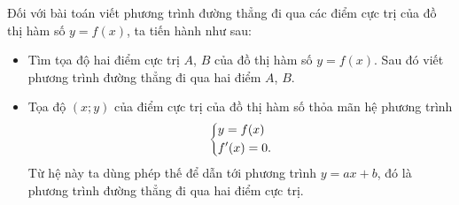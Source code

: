 \begin{note}
	Đối với bài toán viết phương trình đường thẳng đi qua các điểm cực trị của đồ thị hàm số $y=f(x)$, ta tiến hành như sau:
	\begin{itemize}
		\item {} Tìm tọa độ hai điểm cực trị $A$, $B$ của đồ thị hàm số $y=f(x)$. Sau đó viết phương trình
		đường thẳng đi qua hai điểm $A$, $B$.
		\item {} Tọa độ $(x;y)$ của điểm cực trị của đồ thị hàm số thỏa mãn hệ phương trình
		$$\left\{\begin{aligned}&y = f(x)\\&f'(x) = 0.\end{aligned}\right.$$
		Từ hệ này ta dùng phép thế để dẫn tới phương trình $y=ax+b$, đó là phương trình đường thẳng đi qua hai điểm cực trị.
	\end{itemize}
\end{note}

